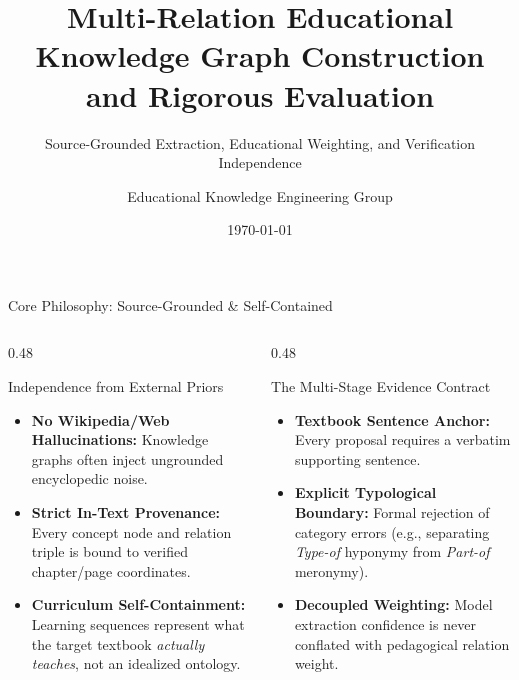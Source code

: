 \documentclass[aspectratio=169,10pt]{beamer}
\title[Evidence-Grounded Multi-Relation Edu-KG]{Multi-Relation Educational Knowledge Graph Construction and Rigorous Evaluation}
\subtitle{Source-Grounded Extraction, Educational Weighting, and Verification Independence}
\author[LearnKG Framework]{Educational Knowledge Engineering Group}
\institute[LearnKG]{Curriculum AI \& Knowledge Graph Research}
\date{\today}
\begin{document}
\begin{frame}[plain]
    \titlepage
\end{frame}

\begin{frame}{Core Philosophy: Source-Grounded \& Self-Contained}
    \begin{columns}[T]
        \begin{column}{0.48\textwidth}
            \begin{block}{Independence from External Priors}
                \begin{itemize}
                    \item \textbf{No Wikipedia/Web Hallucinations:} Knowledge graphs often inject ungrounded encyclopedic noise.
                    \item \textbf{Strict In-Text Provenance:} Every concept node and relation triple is bound to verified chapter/page coordinates.
                    \item \textbf{Curriculum Self-Containment:} Learning sequences represent what the target textbook \textit{actually teaches}, not an idealized ontology.
                \end{itemize}
            \end{block}
        \end{column}

        \begin{column}{0.48\textwidth}
            \begin{exampleblock}{The Multi-Stage Evidence Contract}
                \begin{itemize}
                    \item \textbf{Textbook Sentence Anchor:} Every proposal requires a verbatim supporting sentence.
                    \item \textbf{Explicit Typological Boundary:} Formal rejection of category errors (e.g., separating \textit{Type-of} hyponymy from \textit{Part-of} meronymy).
                    \item \textbf{Decoupled Weighting:} Model extraction confidence is never conflated with pedagogical relation weight.
                \end{itemize}
            \end{exampleblock}
        \end{column}
    \end{columns}


\end{frame}
\end{document}
